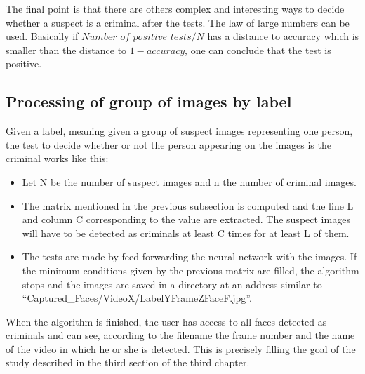 The final point is that there are others complex and interesting ways to decide whether a suspect is a criminal after the tests. The law of large numbers can be used. Basically if \(Number\_of\_positive\_tests / N \) has a distance to accuracy which is smaller than the distance to \(1-accuracy\), one can conclude that the test is positive.

\subsection{Processing of group of images by label}
Given a label, meaning given a group of suspect images representing one person, the test to decide whether or not the person appearing on the images is the criminal works like this:
\begin{itemize}
\item Let N be the number of suspect images and n the number of criminal images.
\item The matrix mentioned in the previous subsection is computed and the line L and column C corresponding to the value are extracted. The suspect images will have to be detected as criminals at least C times for at least L of them.
\item The tests are made by feed-forwarding the neural network with the images. If the minimum conditions given by the previous matrix are filled, the algorithm stops and the images are saved in a directory at an address similar to \enquote{Captured\_Faces/VideoX/LabelYFrameZFaceF.jpg}.
\end{itemize} 

When the algorithm is finished, the user has access to all faces detected as criminals and can see, according to the filename the frame number and the name of the video in which he or she is detected. This is precisely filling the goal of the study described in the third section of the third chapter.
